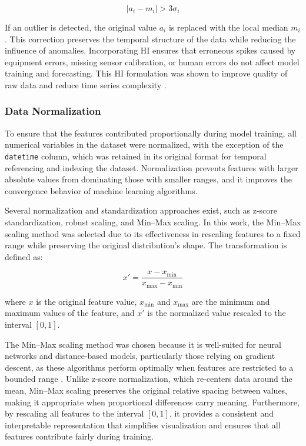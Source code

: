 \[
|a_i - m_i| > 3\sigma_i
\tag{4}
\]

If an outlier is detected, the original value \(a_i\) is replaced with the local median \(m_i\). This correction preserves the temporal structure of the data while reducing the influence of anomalies. Incorporating HI ensures that erroneous spikes caused by equipment errors, missing sensor calibration, or human errors do not affect model training and forecasting. This HI formulation was shown to improve quality of raw data and reduce time series complexity \cite{hiceemdanQteg}.

\subsubsection{Data Normalization}

To ensure that the features contributed proportionally during model training, all numerical variables in the dataset were normalized, with the exception of the \texttt{datetime} column, which was retained in its original format for temporal referencing and indexing the dataset. Normalization prevents features with larger absolute values from dominating those with smaller ranges, and it improves the convergence behavior of machine learning algorithms.

Several normalization and standardization approaches exist, such as z-score standardization, robust scaling, and Min–Max scaling. In this work, the Min–Max scaling method was selected due to its effectiveness in rescaling features to a fixed range while preserving the original distribution’s shape. The transformation is defined as:

\[
x' = \frac{x - x_{\min}}{x_{\max} - x_{\min}}
\tag{5}
\]

where \(x\) is the original feature value, \(x_{\min}\) and \(x_{\max}\) are the minimum and maximum values of the feature, and \(x'\) is the normalized value rescaled to the interval \([0,1]\).

The Min–Max scaling method was chosen because it is well-suited for neural networks and distance-based models, particularly those relying on gradient descent, as these algorithms perform optimally when features are restricted to a bounded range \cite{featureScaling}. Unlike z-score normalization, which re-centers data around the mean, Min–Max scaling preserves the original relative spacing between values, making it appropriate when proportional differences carry meaning. Furthermore, by rescaling all features to the interval \([0,1]\), it provides a consistent and interpretable representation that simplifies visualization and ensures that all features contribute fairly during training.

